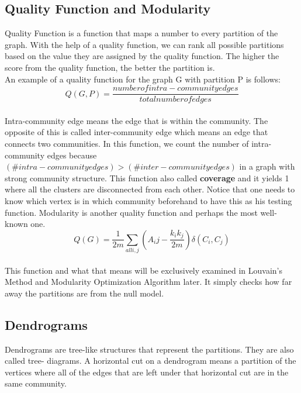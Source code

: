 \documentclass[10pt]{article}
\begin{document}
\subsection{Quality Function and Modularity}

Quality Function is a function that maps a number to every partition of the graph. With the help of a quality function, we can rank all possible partitions based on the value they are assigned by the quality function. The higher the score from the quality function, the better the partition is. \\

An example of a quality function for the graph G with partition P is follows: \\

\[ Q\left( G, P \right)=\frac{number of intra-community edges}{total number of edges} \]\\


Intra-community edge means the edge that is within the community. The opposite of this is called inter-community edge which means an edge that connects two communities. In this function, we count the number of intra-community edges because $\left(\# intra-community edges\right) > \left(\# inter-community edges\right)$ in a graph with strong community structure. This function also called \textbf{coverage} and it yields 1 where all the clusters are disconnected from each other. Notice that one needs to know which vertex is in which community beforehand to have this as his testing function.
Modularity is another quality function and perhaps the most well-known one. \\
\[ Q\left(G\right) = \frac{1}{2m}  \sum_{all i,j} \left( A_ij - \frac{k_i k_j}{2m} \right)  \delta \left( C_i, C_j\right) \] \\
This function and what that means will be exclusively examined in Louvain’s Method and Modularity Optimization Algorithm later. It simply checks how far away the partitions are from the null model. \\

\subsection{Dendrograms}

Dendrograms are tree-like structures that represent the partitions. They are also called tree- diagrams. A horizontal cut on a dendrogram means a partition of the vertices where all of the edges that are left under that horizontal cut are in the same community. \\
\end{document}
